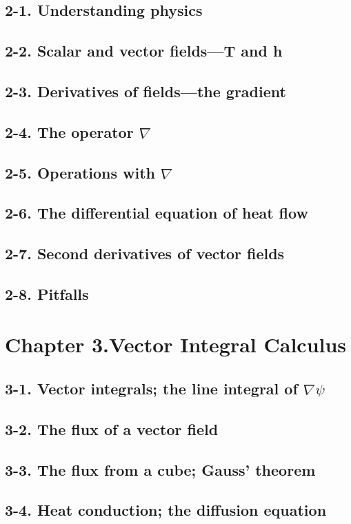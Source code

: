 \documentclass{article}
\begin{document}
\subsection{2-1. Understanding physics}
\subsection{2-2. Scalar and vector fields—T and h}
\subsection{2-3. Derivatives of fields—the gradient}
\subsection{2-4. The operator $\nabla$}
\subsection{2-5. Operations with $\nabla$}
\subsection{2-6. The differential equation of heat flow}
\subsection{2-7. Second derivatives of vector fields}
\subsection{2-8. Pitfalls}
\section{Chapter 3.Vector Integral Calculus}
\subsection{3-1. Vector integrals; the line integral of $\nabla \psi$}
\subsection{3-2. The flux of a vector field}
\subsection{3-3. The flux from a cube; Gauss’ theorem}
\subsection{3-4. Heat conduction; the diffusion equation}
\end{document}
